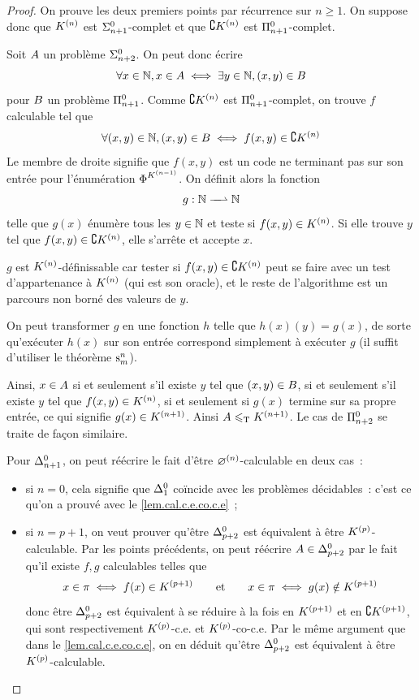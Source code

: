 \begin{proof}
  On prouve les deux premiers points par récurrence sur $n \geq 1$. On suppose
  donc que $K^{(n)}$ est $\Sigma^0_{n+1}$-complet et que
  $\complement K^{(n)}$ est $\Pi^0_{n+1}$-complet.

  Soit $A$ un problème $\Sigma^0_{n+2}$. On peut donc écrire
  \[\forall x \in \mathbb N, x \in A \iff \exists y \in \mathbb N, (x,y) \in B\]
  pour $B$ un problème $\Pi^0_{n+1}$. Comme $\complement K^{(n)}$
  est $\Pi^0_{n+1}$-complet, on trouve $f$ calculable tel que
  \[\forall (x,y) \in \mathbb N, (x,y) \in B \iff
  f(x,y) \in \complement K^{(n)}\]
  Le membre de droite signifie que $f(x,y)$ est un code ne terminant pas sur son
  entrée pour l'énumération $\operatorname{\Phi}_{}^{K^{(n-1)}}$. On définit alors la fonction
  \[\makeFunNamePartial{g}{\bN}{\bN}\]
  telle que $g(x)$ énumère tous les $y\in\mathbb N$ et teste si
  $f(x,y) \in K^{(n)}$. Si elle trouve $y$ tel que
  $f(x,y) \in \complement K^{(n)}$, elle s'arrête et accepte $x$.

  $g$ est $K^{(n)}$-définissable car tester si
  $f(x,y) \in \complement K^{(n)}$ peut se faire avec un test d'appartenance
  à $K^{(n)}$ (qui est son oracle), et le reste de l'algorithme est un
  parcours non borné des valeurs de $y$.

  On peut transformer $g$ en une fonction $h$ telle que $h(x)(y) = g(x)$, de
  sorte qu'exécuter $h(x)$ sur son entrée correspond simplement à exécuter
  $g$ (il suffit d'utiliser le théorème $\mathrm{s}_{m}^{n}$).

  Ainsi, $x \in A$ si et seulement s'il existe $y$ tel que
  $(x,y) \in B$, si et seulement s'il existe $y$ tel que
  $f(x,y) \in K^{(n)}$, si et seulement si $g(x)$ termine sur sa propre
  entrée, ce qui signifie $g(x) \in K^{(n+1)}$. Ainsi
  $A \leqslant_{\mathrm{T}} K^{(n+1)}$. Le cas de $\Pi^0_{n+2}$ se traite de
  façon similaire.
  
  Pour $\Delta^0_{n+1}$, on peut réécrire le fait d'être
  $\varnothing^{(n)}$-calculable en deux cas~:
  \begin{itemize}
  \item si $n = 0$, cela signifie que $\Delta^0_{1}$ coïncide avec les
    problèmes décidables~: c'est ce qu'on a prouvé avec le
    \cref{lem.cal.c.e.co.c.e}~;
  \item si $n = p + 1$, on veut prouver qu'être $\Delta^0_{p+2}$ est
    équivalent à être $K^{(p)}$-calculable. Par les points précédents, on
    peut réécrire $A\in\Delta^0_{p+2}$ par le fait qu'il existe
    $f,g$ calculables telles que
    \[x\in \pi\iff f(x) \in K^{(p+1)}
    \qquad\text{et}\qquad
    x \in \pi \iff g(x) \notin K^{(p+1)}\]
    donc être $\Delta^0_{p+2}$ est équivalent à se réduire à la fois en
    $K^{(p+1)}$ et en $\complement K^{(p+1)}$, qui sont respectivement
    $K^{(p)}$-c.e. et $K^{(p)}$-co-c.e. Par le même argument que dans le
    \cref{lem.cal.c.e.co.c.e}, on en déduit qu'être $\Delta^0_{p+2}$ est
    équivalent à être $K^{(p)}$-calculable. \qedhere
  \end{itemize}
\end{proof}

